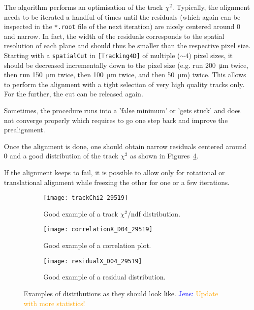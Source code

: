 The algorithm performs an optimisation of the track $\chi^2$.
Typically, the alignment needs to be iterated a handful of times until the residuals (which again can be inspected in the \texttt{*.root} file of the next iteration) are nicely centered around 0 and narrow.
In fact, the width of the residuals corresponds to the spatial resolution of each plane and should thus be smaller than the respective pixel size.
Starting with a \texttt{spatialCut} in \texttt{[Tracking4D]} of multiple ($\sim4$) pixel sizes, it should be decreased incrementally down to the pixel size (e.g. run \SI{200}{\micro\m} twice, then run \SI{150}{\micro\m} twice, then \SI{100}{\micro\m} twice, and then \SI{50}{\micro\m}) twice.
This allows to perform the alignment with a tight selection of very high quality tracks only.
For the further, the cut can be released again.

Sometimes, the procedure runs into a 'false minimum' or 'gets stuck' and does not converge properly which requires to go one step back and improve the prealignment.

Once the alignment is done, one should obtain narrow residuals centered around 0 and a good distribution of the track $\chi^2$ as shown in Figures~\ref{fig:exampleAlignment}.

If the alignment keeps to fail, it is possible to allow only for rotational or translational alignment while freezing the other for one or a few iterations.

\begin{figure}
    \centering
    \begin{subfigure}[t]{0.66\textwidth}
        \texttt{[image: trackChi2\_29519]}
        \caption{Good example of a track $\chi^2$/ndf distribution.}
        \label{fig:trackChi2}
    \end{subfigure}
    \begin{subfigure}[t]{0.66\textwidth}
        \texttt{[image: correlationX\_D04\_29519]}
        \caption{Good example of a correlation plot.}
        \label{fig:correlationX}
    \end{subfigure}
    \begin{subfigure}[t]{0.66\textwidth}
        \texttt{[image: residualX\_D04\_29519]}
        \caption{Good example of a residual distribution.}
        \label{fig:residualX}
    \end{subfigure}
    \caption{Examples of distributions as they should look like. \textcolor{blue}{Jens: }\textcolor{orange}{Update with more statistics!}}
    \label{fig:exampleAlignment}
\end{figure}

